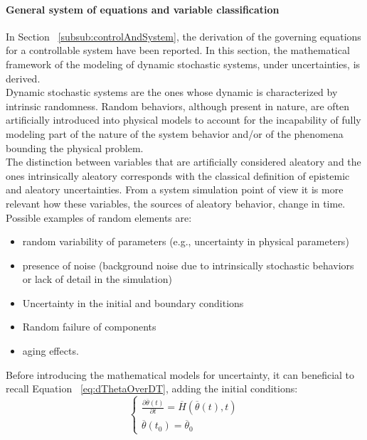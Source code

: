 \paragraph{General system of equations and variable classification}
\label{par:generalSystemOfEqAndVarsClassification}
In Section ~\ref{subsub:controlAndSystem}, the derivation of the governing equations for a controllable system
have been reported. In this section, the mathematical framework of the modeling of dynamic stochastic systems,
under uncertainties, is derived. 
\\ Dynamic stochastic systems are the ones whose dynamic is characterized by intrinsic randomness. Random 
behaviors, although present in nature, are often artificially introduced into physical models to account for the 
incapability of fully modeling part of the nature of the system behavior and/or of the phenomena bounding the
physical problem.
\\The distinction between variables that are artificially considered aleatory and the ones intrinsically aleatory 
corresponds with the classical definition of epistemic and aleatory uncertainties. From a 
system simulation point of view it is more relevant how these variables, the sources of aleatory behavior, change 
in time.
Possible examples of random elements are:
\begin{itemize}
 \item random variability of parameters (e.g., uncertainty in physical parameters)
 \item presence of noise (background noise due to intrinsically stochastic behaviors or lack of detail in the 
 simulation)
 \item Uncertainty in the initial and boundary conditions
 \item Random failure of components
 \item aging effects.
\end{itemize}
Before introducing the mathematical models for uncertainty,  it can beneficial to recall 
Equation ~\ref{eq:dThetaOverDT}, adding the initial conditions:
\begin{equation}
\label{eq:dThetaOverDTWithBoundary}
\left\{\begin{matrix}
\frac{\partial  \overline{\theta}\left ( t \right )}{\partial t}=\overline{H}\left (  \overline{\theta}\left ( t \right ),t \right ) \\ 
 \overline{\theta}\left ( t_{0} \right ) = \overline{\theta}_{0}
\end{matrix}\right.
\end{equation}
